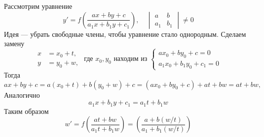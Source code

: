 \documentclass[12pt,a4paper]{article}
\numberwithin{equation}{section}
\begin{document}
\label{box:type4}
\begin{definitionHSE}
Рассмотрим уравнение
\[y'=f\left(\frac{ax+by+c}{a_1x+b_1y+c_1}\right),\quad\begin{vmatrix}a&b\\a_1&b_1\end{vmatrix}\neq0\]
Идея --- убрать свободные члены, чтобы уравнение стало однородным. Сделаем замену
\[
\begin{aligned}
x&=x_0+t,\\y&=y_0+w,
\end{aligned}
\text{ где }x_0,y_0\text{ находим из }\begin{cases}
ax_0+by_0+c=0\\a_1x_0+b_1y_0+c_1=0
\end{cases}
\]
Тогда
\[ax+by+c=a(x_0+t)+b(y_0+w)+c=(ax_0+by_0+c)+at+bw=at+bw,\]
Аналогично
\[a_1x+b_1y+c_1=a_1t+b_1w\]
Таким образом
\[w'=f\left(\frac{at+bw}{a_1t+b_1w}\right)=\left(\frac{a+b(w/t)}{a_1+b_1(w/t)}\right)\]
\end{definitionHSE}
\end{document}
